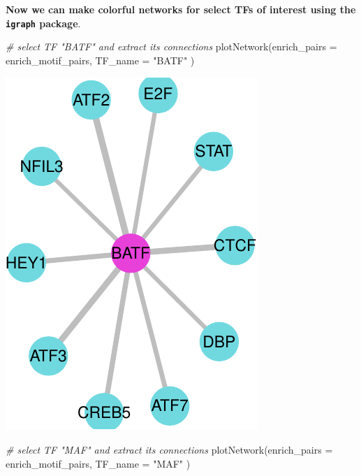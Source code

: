 \documentclass[
]{article}
\newenvironment{Shaded}{}{}
\newcommand{\AttributeTok}[1]{\textcolor[rgb]{0.49,0.56,0.16}{#1}}
\newcommand{\CommentTok}[1]{\textcolor[rgb]{0.38,0.63,0.69}{\textit{#1}}}
\newcommand{\FunctionTok}[1]{\textcolor[rgb]{0.02,0.16,0.49}{#1}}
\newcommand{\NormalTok}[1]{#1}
\newcommand{\StringTok}[1]{\textcolor[rgb]{0.25,0.44,0.63}{#1}}
\begin{document}
\textbf{Now we can make colorful networks for select TFs of interest
using the \texttt{igraph} package}.

\begin{Shaded}
\begin{Highlighting}[]

\CommentTok{\# select TF "BATF" and extract its connections}
\FunctionTok{plotNetwork}\NormalTok{(}\AttributeTok{enrich\_pairs =}\NormalTok{ enrich\_motif\_pairs, }
            \AttributeTok{TF\_name =} \StringTok{"BATF"}
\NormalTok{            )}
\end{Highlighting}
\end{Shaded}

\includegraphics{enrichmotifpairR_user_manual_guide_files/figure-latex/CD8_H3K27ac_vs_H3K27me3_6-1.pdf}

\begin{Shaded}
\begin{Highlighting}[]

\CommentTok{\# select TF "MAF" and extract its connections}
\FunctionTok{plotNetwork}\NormalTok{(}\AttributeTok{enrich\_pairs =}\NormalTok{ enrich\_motif\_pairs, }
            \AttributeTok{TF\_name =} \StringTok{"MAF"}
\NormalTok{            )}
\end{Highlighting}
\end{Shaded}
\end{document}

